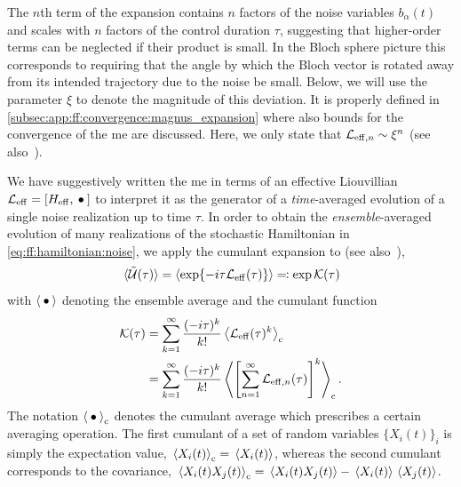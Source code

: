The $n$th term of the expansion contains $n$ factors of the noise variables $b_\alpha(t)$ and scales with $n$ factors of the control duration $\tau$, suggesting that higher-order terms can be neglected if their product is small.
In the Bloch sphere picture this corresponds to requiring that the angle by which the Bloch vector is rotated away from its intended trajectory due to the noise be small.
Below, we will use the parameter $\xi$ to denote the magnitude of this deviation.
It is properly defined in \cref{subsec:app:ff:convergence:magnus_expansion} where also bounds for the convergence of the \gls{me} are discussed.
Here, we only state that $\mathcal{L}_{\mathrm{eff},n}\sim\xi^n$ (see also~).

We have suggestively written the \gls{me} in terms of an effective Liouvillian $\Li_\mr{eff} = \comm{H_\mr{eff}}{\placeholder}$ to interpret it as the generator of a \emph{time}-averaged evolution of a single noise realization up to time $\tau$.
In order to obtain the \emph{ensemble}-averaged evolution of many realizations of the stochastic Hamiltonian in \cref{eq:ff:hamiltonian:noise}, we apply the cumulant expansion to \liouvUe (see also~),
\begin{equation}\label{eq:ff:cumulant_expansion}
    \ev*{\liouvUe(\tau)} = \ev{\exp\lbrace -\i\tau\Li_\mr{eff}(\tau)\rbrace} \eqqcolon \exp\cumulantfun(\tau)
\end{equation}
with $\ev{\placeholder}$ denoting the ensemble average
and the cumulant function~\cite{Kubo1962}
\begin{align}
    \cumulantfun(\tau) &= \sum_{k=1}^\infty\frac{(-\i\tau)^k}{k!}\ev{\Li_\mr{eff}(\tau)^k}_\mr{c} \\
                       &= \sum_{k=1}^\infty\frac{(-\i\tau)^k}{k!}\ev{\left[\sum_{n=1}^\infty \Li_{\mr{eff},n}(\tau)\right]^k}_\mr{c}. \label{eq:ff:cumulant}
\end{align}
The notation $\ev{\placeholder}_\mr{c}$ denotes the cumulant average which prescribes a certain averaging operation.
The first cumulant of a set of random variables $\{X_i(t)\}_i$ is simply the expectation value, $\ev*{X_i(t)}_\mr{c} = \ev*{X_i(t)}$, whereas the second cumulant corresponds to the covariance, $\ev*{X_i(t)X_j(t)}_\mr{c} = \ev*{X_i(t)X_j(t)} - \ev*{X_i(t)}\ev*{X_j(t)}$.
